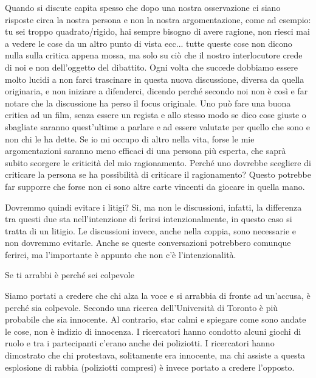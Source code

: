 \documentclass[12pt]{book} %
\begin{document}
Quando si discute capita spesso che dopo una nostra osservazione ci siano risposte circa la nostra persona e non la nostra argomentazione, come ad esempio: tu sei troppo quadrato/rigido, hai sempre bisogno di avere ragione, non riesci mai a vedere le cose da un altro punto di vista ecc... tutte queste cose non dicono nulla sulla critica appena mossa, ma solo su ciò che il nostro interlocutore crede di noi e non dell'oggetto del dibattito. Ogni volta che succede dobbiamo essere molto lucidi a non farci trascinare in questa nuova discussione, diversa da quella originaria, e non iniziare a difenderci, dicendo perché secondo noi non è così e far notare che la discussione ha perso il focus originale. Uno può fare una buona critica ad un film, senza essere un regista e allo stesso modo se dico cose giuste o sbagliate saranno quest'ultime a parlare e ad essere valutate per quello che sono e non chi le ha dette. Se io mi occupo di altro nella vita, forse le mie argomentazioni saranno meno efficaci di una persona più esperta, che saprà subito scorgere le criticità del mio ragionamento. Perché uno dovrebbe scegliere di criticare la persona se ha possibilità di criticare il ragionamento? Questo potrebbe far supporre che forse non ci sono altre carte vincenti da giocare in quella mano.

Dovremmo quindi evitare i litigi? Si, ma non le discussioni, infatti, la differenza tra questi due sta
nell'intenzione di ferirsi intenzionalmente, in questo caso si tratta di un litigio. Le
discussioni invece, anche nella coppia, sono necessarie e non dovremmo evitarle. Anche se queste conversazioni
potrebbero comunque ferirci, ma l'importante è appunto che non c'è l'intenzionalità.

\bigskip
\begin{mdframed}[linewidth=1pt]
Se ti arrabbi è perché sei colpevole

Siamo portati a credere che chi alza la voce e si arrabbia di fronte ad un'accusa, è perché sia
colpevole. Secondo una ricerca dell'Università di Toronto è più probabile che sia innocente. Al contrario, star calmi e
spiegare come sono andate le cose, non è indizio di innocenza. I ricercatori hanno condotto alcuni giochi di ruolo e
tra i partecipanti c'erano anche dei poliziotti. I ricercatori hanno dimostrato che chi
protestava, solitamente era innocente, ma chi assiste a questa esplosione di rabbia (poliziotti compresi) è invece
portato a credere l'opposto. 
\end{mdframed}

\bigskip
\end{document}
